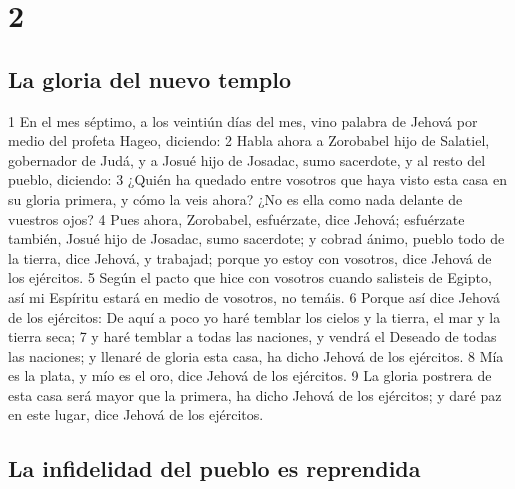 \chapter{2}

\section*{La gloria del nuevo templo}

1 En el mes séptimo, a los veintiún días del mes, vino palabra de Jehová por medio del profeta Hageo, diciendo:
2 Habla ahora a Zorobabel hijo de Salatiel, gobernador de Judá, y a Josué hijo de Josadac, sumo sacerdote, y al resto del pueblo, diciendo:
3 ¿Quién ha quedado entre vosotros que haya visto esta casa en su gloria primera, y cómo la veis ahora? ¿No es ella como nada delante de vuestros ojos?
4 Pues ahora, Zorobabel, esfuérzate, dice Jehová; esfuérzate también, Josué hijo de Josadac, sumo sacerdote; y cobrad ánimo, pueblo todo de la tierra, dice Jehová, y trabajad; porque yo estoy con vosotros, dice Jehová de los ejércitos.
5 Según el pacto que hice con vosotros cuando salisteis de Egipto, así mi Espíritu estará en medio de vosotros, no temáis.
6 Porque así dice Jehová de los ejércitos: De aquí a poco yo haré temblar los cielos y la tierra, el mar y la tierra seca;
7 y haré temblar a todas las naciones, y vendrá el Deseado de todas las naciones; y llenaré de gloria esta casa, ha dicho Jehová de los ejércitos.
8 Mía es la plata, y mío es el oro, dice Jehová de los ejércitos.
9 La gloria postrera de esta casa será mayor que la primera, ha dicho Jehová de los ejércitos; y daré paz en este lugar, dice Jehová de los ejércitos.

\section*{La infidelidad del pueblo es reprendida}

